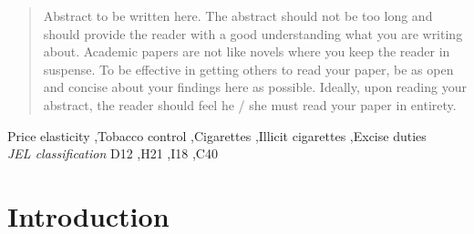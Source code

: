 \documentclass[11pt,preprint, authoryear]{elsarticle}
\numberwithin{equation}{section}
\numberwithin{figure}{section}
\numberwithin{table}{section}
\begin{document}
\begin{frontmatter}  %

\title{}


\begin{abstract}
\small{
Abstract to be written here. The abstract should not be too long and
should provide the reader with a good understanding what you are writing
about. Academic papers are not like novels where you keep the reader in
suspense. To be effective in getting others to read your paper, be as
open and concise about your findings here as possible. Ideally, upon
reading your abstract, the reader should feel he / she must read your
paper in entirety.
}
\end{abstract}

\vspace{1cm}


\begin{keyword}
\footnotesize{
Price elasticity \sep Tobacco control \sep Cigarettes \sep Illicit
cigarettes \sep Excise duties \\
\vspace{0.3cm}
}
\footnotesize{
\textit{JEL classification} D12 \sep H21 \sep I18 \sep C40
}
\end{keyword}



\vspace{0.5cm}

\end{frontmatter}


\renewcommand{\contentsname}{Table of Contents}
{\tableofcontents}

\pagestyle{fancy}
\chead{}
\rhead{}
\lfoot{}
\lhead{}
\cfoot{}


\headsep 35pt %




\hypertarget{introduction}{%
\section{\texorpdfstring{Introduction
\label{Introduction}}{Introduction }}\label{introduction}}
\end{document}
